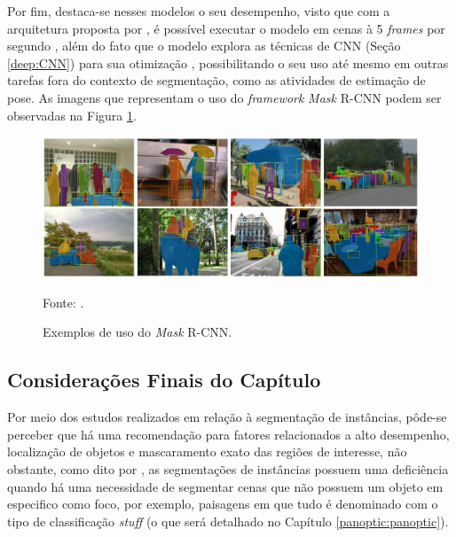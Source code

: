 Por fim, destaca-se nesses modelos o seu desempenho, visto que com a arquitetura proposta por \cite{He2020}, é possível executar o modelo em cenas à 5 \textit{frames} por segundo \cite{Minaee2021, He2020, Hafiz2020}, além do fato que o modelo explora as técnicas de CNN (Seção \ref{deep:CNN}) para sua otimização \cite{Li2020}, possibilitando o seu uso até mesmo em outras tarefas fora do contexto de segmentação, como as atividades de estimação de pose. As imagens que representam o uso do \textit{framework} \textit{Mask} R-CNN podem ser observadas na Figura \ref{instance:fig:3}.

\begin{figure}[H]
    \centering
    \caption{Exemplos de uso do \textit{Mask} R-CNN.}
    \includegraphics[width=1\textwidth]{recursos/imagens/instance/insta_examp.png}
    \label{instance:fig:3}

    \vspace*{1 cm}
    Fonte: \cite{He2020}.
\end{figure}


\subsection{Considerações Finais do Capítulo}
\label{instance:conclusion}

Por meio dos estudos realizados em relação à segmentação de instâncias, pôde-se perceber que há uma recomendação para fatores relacionados a alto desempenho, localização de objetos e mascaramento exato das regiões de interesse, não obstante, como dito por \cite{Kirillov2019a}, as segmentações de instâncias possuem uma deficiência quando há uma necessidade de segmentar cenas que não possuem um objeto em especifico como foco, por exemplo, paisagens em que tudo é denominado com o tipo de classificação \textit{stuff} (o que será detalhado no Capítulo \ref{panoptic:panoptic}).